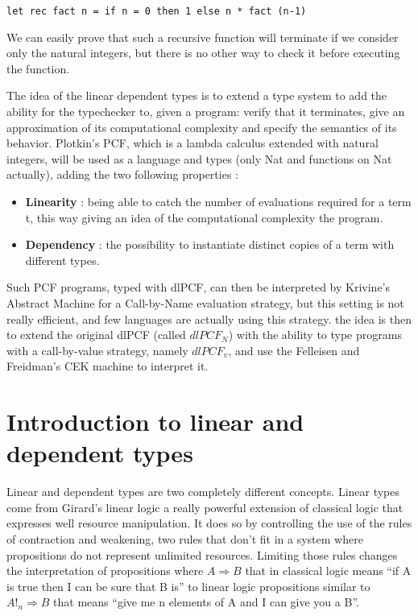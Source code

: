 \documentclass[a4paper,12pt]{report}
\begin{document}
\begin{verbatim}
let rec fact n = if n = 0 then 1 else n * fact (n-1)
\end{verbatim}

We can easily prove that such a recursive function will terminate if we consider
only the natural integers, but there is no other way to check it before
executing the function.

The idea of the linear dependent types is to extend a type system to
add the ability for the typechecker to, given a program: verify that
it terminates, give an approximation of its computational complexity and
specify the semantics of its behavior. Plotkin's PCF, which is a
lambda calculus extended with natural integers, will be used as a
language and types (only Nat and functions on Nat actually), adding
the two following properties :

\begin{itemize}
\item \textbf{Linearity} : being able to catch the number of evaluations required
  for a term t, this way giving an idea of the computational complexity the
  program.
\item \textbf{Dependency} : the possibility to instantiate distinct copies of a term with
  different types.
\end{itemize}

Such PCF programs, typed with dlPCF, can then be interpreted by Krivine's
Abstract Machine for a Call-by-Name evaluation strategy, but this setting is not
really efficient, and few languages are actually using this strategy. the idea
is then to extend the original dlPCF (called $ dlPCF_{N} $) with the ability to type
programs with a call-by-value strategy, namely $ dlPCF_{v} $, and use the Felleisen and
Freidman's CEK machine to interpret it.

\section{Introduction to linear and dependent types}

Linear and dependent types are two completely different
concepts. Linear types come from Girard's linear logic
\cite{girard1987linear} a really powerful extension of classical logic
that expresses well resource manipulation. It does so by controlling
the use of the rules of contraction and weakening, two rules that
don't fit in a system where propositions do not represent unlimited
resources. Limiting those rules changes the interpretation of
propositions where $A \Rightarrow B$ that in classical logic means
``if A is true then I can be sure that B is'' to linear logic
propositions similar to $A!_n \Rightarrow B$ that means ``give me n
elements of A and I can give you a B''.
\end{document}
